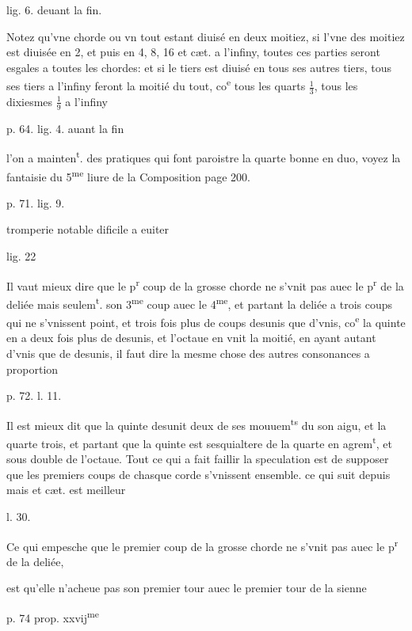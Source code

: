 \documentclass[11pt,a4paper]{article}
\begin{document}
lig. 6. deuant la fin.

Notez qu'vne chorde ou vn tout estant diuisé en deux moitiez, si l'vne des moitiez est diuisée en 2, et puis en 4, 8, 16 et cæt. a l'infiny, toutes ces parties seront esgales a toutes les chordes: et si le tiers est diuisé en tous ses autres tiers, tous ses tiers a l'infiny feront la moitié du tout, co\textsuperscript{e} tous les quarts $\frac{1}{3}$, tous les dixiesmes $\frac{1}{9}$ a l'infiny

p. 64. lig. 4. auant la fin

l'on a mainten\textsuperscript{t}. des pratiques qui font paroistre la quarte bonne en duo, voyez la fantaisie du 5\textsuperscript{me} liure de la Composition page 200.

p. 71. lig. 9.

tromperie notable dificile a euiter

lig. 22

Il vaut mieux dire que le p\textsuperscript{r} coup de la grosse chorde ne s'vnit pas auec le p\textsuperscript{r} de la deliée mais seulem\textsuperscript{t}. son 3\textsuperscript{me} coup auec le 4\textsuperscript{me}, et partant la deliée a trois coups qui ne s'vnissent point, et trois fois plus de coups desunis que d'vnis, co\textsuperscript{e} la quinte en a deux fois plus de desunis, et l'octaue en vnit la moitié, en ayant autant d'vnis que de desunis, il faut dire la mesme chose des autres consonances a proportion

p. 72. l. 11.

Il est mieux dit que la quinte desunit deux de ses mouuem\textsuperscript{ts} du son aigu, et la quarte trois, et partant que la quinte est sesquialtere de la quarte en agrem\textsuperscript{t}, et sous double de l'octaue. Tout ce qui a fait faillir la speculation est de supposer que les premiers coups de chasque corde s'vnissent ensemble. ce qui suit depuis mais et cæt. est meilleur

l. 30.

Ce qui empesche que le premier coup de la grosse chorde ne s'vnit pas auec le p\textsuperscript{r} de la deliée,


est qu'elle n'acheue pas son premier tour auec le premier tour de la sienne

p. 74 prop. xxvij\textsuperscript{me}
\end{document}
